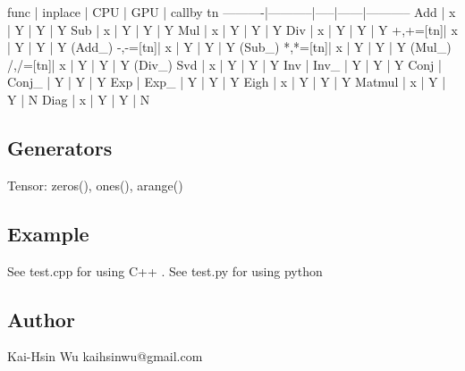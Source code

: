 \begin{DoxyVerb}  func    |   inplace | CPU | GPU  | callby tn 
----------|-----------|-----|------|-----------
  Add     |   x       |  Y  |  Y   |    Y
  Sub     |   x       |  Y  |  Y   |    Y
  Mul     |   x       |  Y  |  Y   |    Y
  Div     |   x       |  Y  |  Y   |    Y
  +,+=[tn]|   x       |  Y  |  Y   |    Y (Add_)
  -,-=[tn]|   x       |  Y  |  Y   |    Y (Sub_)
  *,*=[tn]|   x       |  Y  |  Y   |    Y (Mul_)
  /,/=[tn]|   x       |  Y  |  Y   |    Y (Div_)
  Svd     |   x       |  Y  |  Y   |    Y
  Inv     |   Inv_    |  Y  |  Y   |    Y
  Conj    |   Conj_   |  Y  |  Y   |    Y 
  Exp     |   Exp_    |  Y  |  Y   |    Y
  Eigh    |   x       |  Y  |  Y   |    Y 
  Matmul  |   x       |  Y  |  Y   |    N
  Diag    |   x       |  Y  |  Y   |    N
\end{DoxyVerb}


\subsection*{Generators}

\begin{DoxyVerb}Tensor: zeros(), ones(), arange()
\end{DoxyVerb}


\subsection*{Example}

\begin{DoxyVerb}See test.cpp for using C++ .
See test.py for using python  
\end{DoxyVerb}


\subsection*{Author}

\begin{DoxyVerb}Kai-Hsin Wu kaihsinwu@gmail.com \end{DoxyVerb}
 